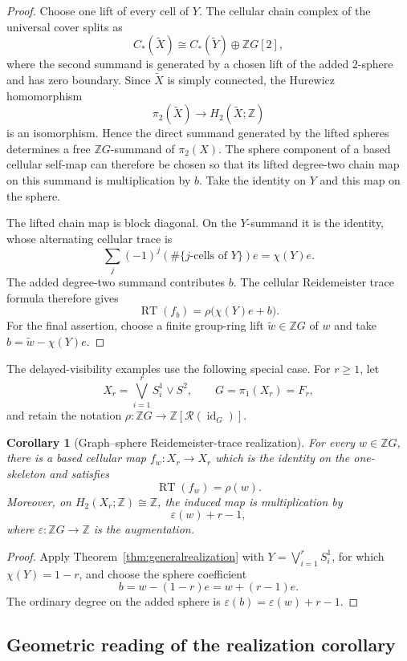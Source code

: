 \documentclass[11pt]{article}
\newtheorem{corollary}[theorem]{Corollary}
\DeclareMathOperator{\id}{id}
\newcommand{\RT}{\operatorname{RT}}
\newcommand{\RN}{\mathcal R}
\newcommand{\Z}{\mathbb Z}
\begin{document}
\begin{proof}
Choose one lift of every cell of $Y$.  The cellular chain complex of the
universal cover splits as
\[
  C_*(\widetilde X)
  \cong C_*(\widetilde Y)\oplus \Z G[2],
\]
where the second summand is generated by a chosen lift of the added
$2$-sphere and has zero boundary.  Since $\widetilde X$ is simply connected,
the Hurewicz homomorphism
\[
  \pi_2(\widetilde X)\longrightarrow H_2(\widetilde X;\Z)
\]
is an isomorphism.  Hence the direct summand generated by the lifted spheres
determines a free $\Z G$-summand of $\pi_2(X)$.  The sphere component of a
based cellular self-map can therefore be chosen so that its lifted degree-two
chain map on this summand is multiplication by $b$.  Take the identity on $Y$
and this map on the sphere.

The lifted chain map is block diagonal.  On the $Y$-summand it is the
identity, whose alternating cellular trace is
\[
  \sum_j(-1)^j(\#\{j\text{-cells of }Y\})e=\chi(Y)e.
\]
The added degree-two summand contributes $b$.  The cellular Reidemeister trace
formula therefore gives
\[
  \RT(f_b)=\rho\bigl(\chi(Y)e+b\bigr).
\]
For the final assertion, choose a finite group-ring lift
$\widetilde w\in\Z G$ of $w$ and take
$b=\widetilde w-\chi(Y)e$.
\end{proof}

The delayed-visibility examples use the following special case.  For
$r\ge1$, let
\[
  X_r=\bigvee_{i=1}^r S^1_i\vee S^2,
  \qquad
  G=\pi_1(X_r)=F_r,
\]
and retain the notation $\rho\colon\Z G\to\Z[\RN(\id_G)]$.

\begin{corollary}[Graph--sphere Reidemeister-trace realization]
\label{cor:realization}
For every $w\in\Z G$, there is a based cellular map
$f_w\colon X_r\to X_r$ which is the identity on the one-skeleton and satisfies
\[
  \RT(f_w)=\rho(w).
\]
Moreover, on $H_2(X_r;\Z)\cong\Z$, the induced map is multiplication by
\[
  \varepsilon(w)+r-1,
\]
where $\varepsilon\colon\Z G\to\Z$ is the augmentation.
\end{corollary}

\begin{proof}
Apply Theorem~\ref{thm:generalrealization} with
$Y=\bigvee_{i=1}^rS_i^1$, for which $\chi(Y)=1-r$, and choose the sphere
coefficient
\[
  b=w-(1-r)e=w+(r-1)e.
\]
The ordinary degree on the added sphere is
$\varepsilon(b)=\varepsilon(w)+r-1$.
\end{proof}

\subsection{Geometric reading of the realization corollary}
\end{document}
